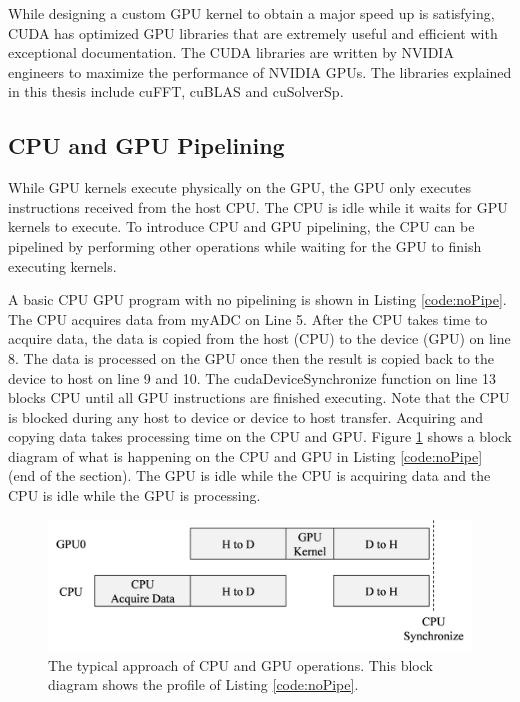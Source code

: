 While designing a custom GPU kernel to obtain a major speed up is satisfying,
CUDA has optimized GPU libraries that are extremely useful and efficient with exceptional documentation.
The CUDA libraries are written by NVIDIA engineers to maximize the performance of NVIDIA GPUs.
The libraries explained in this thesis include cuFFT, cuBLAS and cuSolverSp.

\subsection{CPU and GPU Pipelining}
While GPU kernels execute physically on the GPU, the GPU only executes instructions received from the host CPU.
The CPU is idle while it waits for GPU kernels to execute.
To introduce CPU and GPU pipelining, the CPU can be pipelined by performing other operations while waiting for the GPU to finish executing kernels.

A basic CPU GPU program with no pipelining is shown in Listing \ref{code:noPipe}.
The CPU acquires data from myADC on Line 5.
After the CPU takes time to acquire data, the data is copied from the host (CPU) to the device (GPU) on line 8.
The data is processed on the GPU once then the result is copied back to the device to host on line 9 and 10.
The cudaDeviceSynchronize function on line 13 blocks CPU until all GPU instructions are finished executing.
Note that the CPU is blocked during any host to device or device to host transfer.
Acquiring and copying data takes processing time on the CPU and GPU.
Figure \ref{fig:concurrentCPU_blocking} shows a block diagram of what is happening on the CPU and GPU in Listing \ref{code:noPipe} (end of the section).
The GPU is idle while the CPU is acquiring data and the CPU is idle while the GPU is processing.
\begin{figure}
	\centering\includegraphics[width=8.77in/100*55]{figures/gpu_intro/concurrentCPU_blocking.pdf}
	\caption{The typical approach of CPU and GPU operations. This block diagram shows the profile of Listing \ref{code:noPipe}.}
	\label{fig:concurrentCPU_blocking}
\end{figure}

